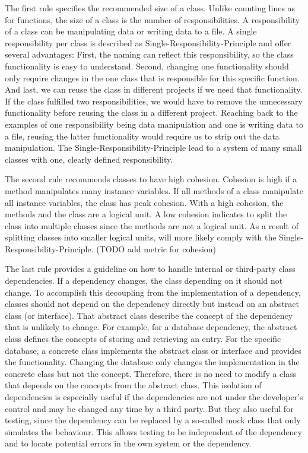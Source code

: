 The first rule specifies the recommended size of a class. Unlike counting lines as for functions, the size of a class is the number of responsibilities. A responsibility of a class can be manipulating data or writing data to a file. A single responsibility per class is described as Single-Responsibility-Principle and offer several advantages: First, the naming can reflect this responsibility, so the class functionality is easy to understand.
Second, changing one functionality should only require changes in the one class that is responsible for this specific function. And last, we can reuse the class in different projects if we need that functionality. If the class fulfilled two responsibilities, we would have to remove the unnecessary functionality before reusing the class in a different project. Reaching back to the examples of one responsibility being data manipulation and one is writing data to a file, reusing the latter functionality would require us to strip out the data manipulation.
The Single-Responsibility-Principle lead to a system of many small classes with one, clearly defined responsibility.

The second rule recommends classes to have high cohesion. Cohesion is high if a method manipulates many instance variables. If all methods of a class manipulate all instance variables, the class has peak cohesion. With a high cohesion, the methods and the class are a logical unit. A low cohesion indicates to split the class into multiple classes since the methods are not a logical unit. As a result of splitting classes into smaller logical units, will more likely comply with the Single-Responsibility-Principle. (TODO add metric for cohesion)

The last rule provides a guideline on how to handle internal or third-party class dependencies. If a dependency changes, the class depending on it should not change. To accomplish this decoupling from the implementation of a dependency, classes should not depend on the dependency directly but instead on an abstract class (or interface). That abstract class describe the concept of the dependency that is unlikely to change. For example, for a database dependency, the abstract class defines the concepts of storing and retrieving an entry. For the specific database, a concrete class implements the abstract class or interface and provides the functionality. Changing the database only changes the implementation in the concrete class but not the concept. Therefore, there is no need to modify a class that depends on the concepts from the abstract class. This isolation of dependencies is especially useful if the dependencies are not under the developer's control and may be changed any time by a third party. But they also useful for testing, since the dependency can be replaced by a so-called mock class that only simulates the behaviour. This allows testing to be independent of the dependency and to locate potential errors in the own system or the dependency.

